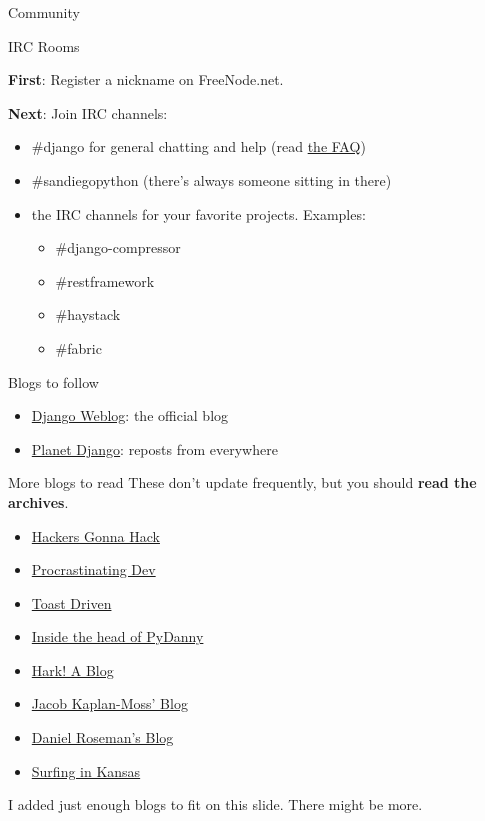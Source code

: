\documentclass[xcolor=dvipsnames]{beamer}
\begin{document}
\begin{section}{Community}
  \begin{frame}{IRC Rooms}

    {\bf First}: Register a nickname on FreeNode.net.

    {\bf Next}: Join IRC channels:

    \begin{itemize}
      \item \#django for general chatting and help (read \href{https://code.djangoproject.com/wiki/IrcFAQ}{the FAQ})
      \item \#sandiegopython (there's always someone sitting in there)
      \item the IRC channels for your favorite projects.  Examples:
        \begin{itemize}
          \item \#django-compressor
          \item \#restframework
          \item \#haystack
          \item \#fabric
        \end{itemize}
    \end{itemize}
  \end{frame}


  \begin{frame}{Blogs to follow}
    \begin{itemize}
      \item \href{https://www.djangoproject.com/weblog/}{Django Weblog}: the official blog
      \item \href{http://www.planetdjango.org/}{Planet Django}: reposts from everywhere
    \end{itemize}
  \end{frame}

  \begin{frame}{More blogs to read}
    These don't update frequently, but you should {\bf read the archives}.

    \begin{itemize}
      \item \href{https://www.djangoproject.com/weblog/}{Hackers Gonna Hack}
      \item \href{http://procrastinatingdev.com/}{Procrastinating Dev}
      \item \href{http://toastdriven.com/}{Toast Driven}
      \item \href{http://pydanny.com/}{Inside the head of PyDanny}
      \item \href{http://harkablog.com/}{Hark! A Blog}
      \item \href{http://jacobian.org/writing/}{Jacob Kaplan-Moss' Blog}
      \item \href{http://blog.roseman.org.uk/}{Daniel Roseman's Blog}
      \item \href{http://ericholscher.com/blog/}{Surfing in Kansas}
    \end{itemize}

    I added just enough blogs to fit on this slide.  There might be more.
  \end{frame}

\end{section}
\end{document}
